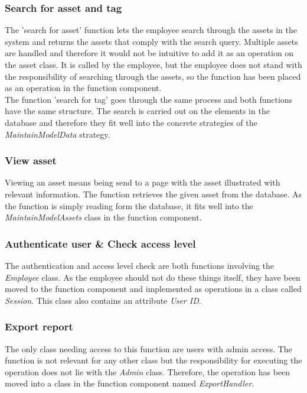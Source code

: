\subsubsection{Search for asset and tag}
The 'search for asset' function lets the employee search through the assets in the system and returns the assets that comply with the search query. Multiple assets are handled and therefore it would not be intuitive to add it as an operation on the asset class. It is called by the employee, but the employee does not stand with the responsibility of searching through the assets, so the function has been placed as an operation in the function component.\\
The function 'search for tag' goes through the same process and both functions have the same structure. The search is carried out on the elements in the database and therefore they fit well into the concrete strategies of the \textit{MaintainModelData} strategy.

\subsubsection{View asset}
Viewing an asset means being send to a page with the asset illustrated with relevant information. The function retrieves the given asset from the database. As the function is simply reading form the database, it fits well into the \textit{MaintainModelAssets} class in the function component.

\subsubsection{Authenticate user \& Check access level}
The authentication and access level check are both functions involving the \textit{Employee} class. As the employee should not do these things itself, they have been moved to the function component and implemented as operations in a class called \textit{Session}. This class also contains an attribute \textit{User ID}.

\subsubsection{Export report}
The only class needing access to this function are users with admin access. The function is not relevant for any other class but the responsibility for executing the operation does not lie with the \textit{Admin} class. Therefore, the operation has been moved into a class in the function component named \textit{ExportHandler}.

